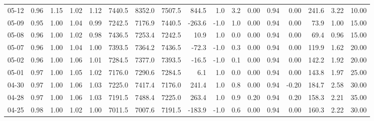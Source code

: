 \begin{threeparttable}
{\begin{tabular}{lrrrrrrrrrrrrrrrr}
  05-12 &         0.96 &           1.15 &          1.02 &          1.12 & 7440.5 & 8352.0 & 7507.5 &      844.5 &                      1.0 &                 3.2 &       0.00 &      0.94 &           0.00 &            241.6 &            3.22 &                  10.00 \\
  05-09 &         0.95 &           1.00 &          1.04 &          0.99 & 7242.5 & 7176.9 & 7440.5 &     -263.6 &                     -1.0 &                 1.0 &       0.00 &      0.94 &           0.00 &             73.9 &            1.00 &                  15.00 \\
  05-08 &         0.96 &           1.00 &          1.02 &          0.98 & 7436.5 & 7253.4 & 7242.5 &       10.9 &                      1.0 &                 0.0 &       0.00 &      0.94 &           0.00 &             69.4 &            0.96 &                  15.00 \\
  05-07 &         0.96 &           1.00 &          1.04 &          1.00 & 7393.5 & 7364.2 & 7436.5 &      -72.3 &                     -1.0 &                 0.3 &       0.00 &      0.94 &           0.00 &            119.9 &            1.62 &                  20.00 \\
  05-02 &         0.96 &           1.00 &          1.06 &          1.01 & 7284.5 & 7377.0 & 7393.5 &      -16.5 &                     -1.0 &                 0.1 &       0.00 &      0.94 &           0.00 &            142.2 &            1.92 &                  20.00 \\
  05-01 &         0.97 &           1.00 &          1.05 &          1.02 & 7176.0 & 7290.6 & 7284.5 &        6.1 &                      1.0 &                 0.0 &       0.00 &      0.94 &           0.00 &            143.8 &            1.97 &                  25.00 \\
  04-30 &         0.97 &           1.00 &          1.06 &          1.03 & 7225.0 & 7417.4 & 7176.0 &      241.4 &                      1.0 &                 0.8 &       0.00 &      0.94 &          -0.20 &            184.7 &            2.58 &                  30.00 \\
  04-28 &         0.97 &           1.00 &          1.06 &          1.03 & 7191.5 & 7488.4 & 7225.0 &      263.4 &                      1.0 &                 0.9 &       0.20 &      0.94 &           0.20 &            158.3 &            2.21 &                  35.00 \\
  04-25 &         0.98 &           1.00 &          1.02 &          1.00 & 7011.5 & 7007.6 & 7191.5 &     -183.9 &                     -1.0 &                 0.6 &       0.00 &      0.94 &           0.00 &            160.3 &            2.22 &                  30.00 \\

\end{tabular}}
\end{threeparttable}
